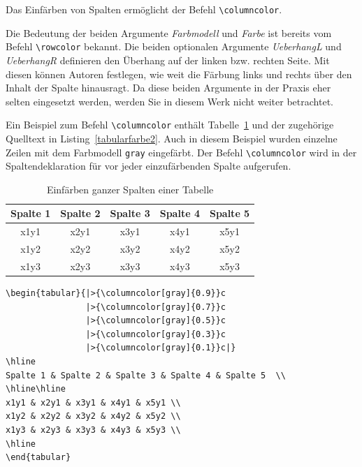\documentclass[a4paper,10pt,twoside]{scrbook}
\begin{document}
{Das Einfärben von Spalten ermöglicht der Befehl \verb!\columncolor!.



Die Bedeutung der beiden Argumente \textsl{Farbmodell} und \textsl{Farbe} ist bereits vom Befehl \verb!\rowcolor! bekannt. Die beiden optionalen Argumente
\textsl{UeberhangL} und \textsl{UeberhangR} definieren den Überhang auf der linken bzw. rechten Seite. Mit diesen können Autoren festlegen, wie weit die Färbung links und 
rechts über den Inhalt der Spalte hinausragt. Da diese beiden Argumente in der Praxis eher selten eingesetzt werden, werden Sie in diesem Werk nicht weiter betrachtet.


Ein Beispiel zum Befehl \verb!\columncolor! enthält Tabelle~\ref{Tabelle_Farbige_Spalten1} und der zugehörige Quelltext in Listing~\ref{tabularfarbe2}. Auch in diesem Beispiel wurden einzelne Zeilen mit dem Farbmodell \verb!gray! eingefärbt. Der Befehl \verb!\columncolor! wird in der Spaltendeklaration für vor jeder einzufärbenden Spalte aufgerufen.


\begin{table}[h!tb]
\centering
\caption{Einfärben ganzer Spalten einer Tabelle}
\label{Tabelle_Farbige_Spalten1}
\begin{tabular}{|>{\columncolor[gray]{0.9}}c
                |>{\columncolor[gray]{0.7}}c
                |>{\columncolor[gray]{0.5}}c
                |>{\columncolor[gray]{0.3}}c
                |>{\columncolor[gray]{0.1}}c|}
\hline 
Spalte 1 & Spalte 2 & Spalte 3 & Spalte 4 & Spalte 5  \\
\hline\hline
x1y1 & x2y1 & x3y1 & x4y1 & x5y1 \\
x1y2 & x2y2 & x3y2 & x4y2 & x5y2 \\
x1y3 & x2y3 & x3y3 & x4y3 & x5y3 \\
\hline
\end{tabular}
\end{table}



\begin{lstlisting}[caption={Das Einfärben ganzer Spalten einer Tabelle geschieht mit dem Befehl \texttt{columncolor}},label=tabularfarbe2, style=customlatex]
\begin{tabular}{|>{\columncolor[gray]{0.9}}c
                |>{\columncolor[gray]{0.7}}c
                |>{\columncolor[gray]{0.5}}c
                |>{\columncolor[gray]{0.3}}c
                |>{\columncolor[gray]{0.1}}c|}
\hline 
Spalte 1 & Spalte 2 & Spalte 3 & Spalte 4 & Spalte 5  \\
\hline\hline
x1y1 & x2y1 & x3y1 & x4y1 & x5y1 \\
x1y2 & x2y2 & x3y2 & x4y2 & x5y2 \\
x1y3 & x2y3 & x3y3 & x4y3 & x5y3 \\
\hline
\end{tabular}
\end{lstlisting}

}
\end{document}
